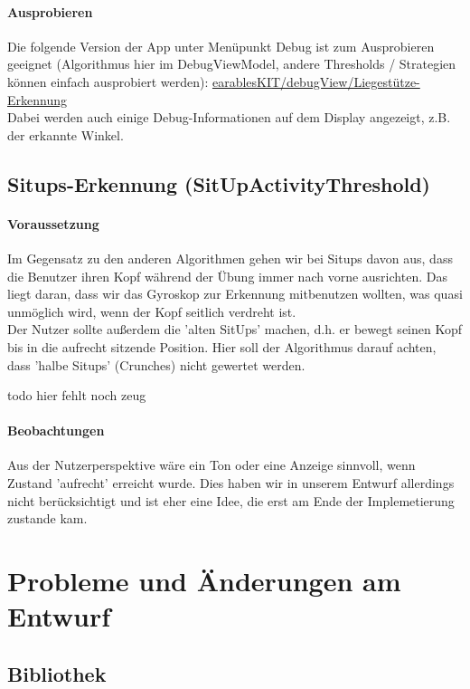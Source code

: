 \documentclass[a4paper,12pt]{article}
\begin{document}
\paragraph{Ausprobieren}
Die folgende Version der App unter Menüpunkt Debug ist zum Ausprobieren geeignet (Algorithmus hier im DebugViewModel, andere Thresholds / Strategien können einfach ausprobiert werden): 
\href{https://github.com/vlle1/earablesKIT/commit/6a4999ac8e2613298a6e6dd9bc85092ddd1b6133}{earablesKIT/debugView/Liegestütze-Erkennung}\\
Dabei werden auch einige Debug-Informationen auf dem Display angezeigt, z.B. der erkannte Winkel.

\subsection{Situps-Erkennung (SitUpActivityThreshold)}
\paragraph{Voraussetzung} 
Im Gegensatz zu den anderen Algorithmen gehen wir bei Situps davon aus, dass die Benutzer ihren Kopf während der Übung immer nach vorne ausrichten. Das liegt daran, dass wir das Gyroskop zur Erkennung mitbenutzen wollten, was quasi unmöglich wird, wenn der Kopf seitlich verdreht ist.\\
Der Nutzer sollte außerdem die 'alten SitUps' machen, d.h. er bewegt seinen Kopf bis in die aufrecht sitzende Position. Hier soll der Algorithmus darauf achten, dass 'halbe Situps' (Crunches) nicht gewertet werden.

todo hier fehlt noch zeug

\paragraph{Beobachtungen}
Aus der Nutzerperspektive wäre ein Ton oder eine Anzeige sinnvoll, wenn Zustand 'aufrecht' erreicht wurde. Dies haben wir in unserem Entwurf allerdings nicht berücksichtigt und ist eher eine Idee, die erst am Ende der Implemetierung zustande kam. 


\section{Probleme und Änderungen am Entwurf}
\label{aenderungen}
\subsection{Bibliothek}
\end{document}
